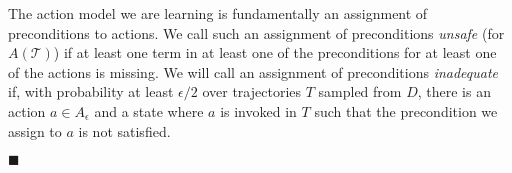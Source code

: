 \documentclass[letterpaper]{article}
\newenvironment{proof}{\noindent{\bf Proof:~~}}{\qed}
\newcommand{\qed}{\hfill\ensuremath{\blacksquare}}
\begin{document}
\begin{proof}


The action model we are learning is fundamentally an assignment of preconditions to actions. We call such an assignment of preconditions {\em unsafe} (for $A(\mathcal{T})$) if at least one term in at least one of the preconditions for at least one of the actions is missing. We will call an assignment of preconditions {\em inadequate} if, with probability at least $\epsilon/2$ over trajectories $T$ sampled from $D$, there is an action $a\in A_\epsilon$ and a state where $a$ is invoked in $T$ such that the precondition we assign to $a$ is not satisfied. 


\end{proof}
\end{document}
